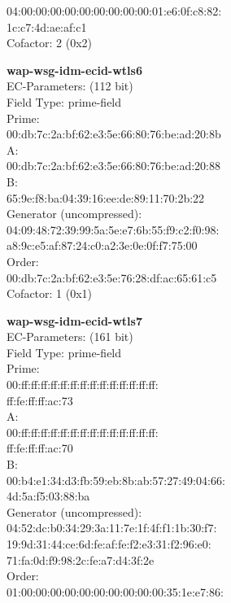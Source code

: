     04:00:00:00:00:00:00:00:00:00:01:e6:0f:c8:82:\\
    1c:c7:4d:ae:af:c1\\
Cofactor:  2 (0x2)\\
\item \textbf{ wap-wsg-idm-ecid-wtls6 }\\
EC-Parameters: (112 bit)\\
Field Type: prime-field\\
Prime:\\
    00:db:7c:2a:bf:62:e3:5e:66:80:76:be:ad:20:8b\\
A:   \\
    00:db:7c:2a:bf:62:e3:5e:66:80:76:be:ad:20:88\\
B:   \\
    65:9e:f8:ba:04:39:16:ee:de:89:11:70:2b:22\\
Generator (uncompressed):\\
    04:09:48:72:39:99:5a:5e:e7:6b:55:f9:c2:f0:98:\\
    a8:9c:e5:af:87:24:c0:a2:3e:0e:0f:f7:75:00\\
Order: \\
    00:db:7c:2a:bf:62:e3:5e:76:28:df:ac:65:61:c5\\
Cofactor:  1 (0x1)\\
\item \textbf{ wap-wsg-idm-ecid-wtls7 }\\
EC-Parameters: (161 bit)\\
Field Type: prime-field\\
Prime:\\
    00:ff:ff:ff:ff:ff:ff:ff:ff:ff:ff:ff:ff:ff:ff:\\
    ff:fe:ff:ff:ac:73\\
A:   \\
    00:ff:ff:ff:ff:ff:ff:ff:ff:ff:ff:ff:ff:ff:ff:\\
    ff:fe:ff:ff:ac:70\\
B:   \\
    00:b4:e1:34:d3:fb:59:eb:8b:ab:57:27:49:04:66:\\
    4d:5a:f5:03:88:ba\\
Generator (uncompressed):\\
    04:52:dc:b0:34:29:3a:11:7e:1f:4f:f1:1b:30:f7:\\
    19:9d:31:44:ce:6d:fe:af:fe:f2:e3:31:f2:96:e0:\\
    71:fa:0d:f9:98:2c:fe:a7:d4:3f:2e\\
Order: \\
    01:00:00:00:00:00:00:00:00:00:00:35:1e:e7:86:\\

